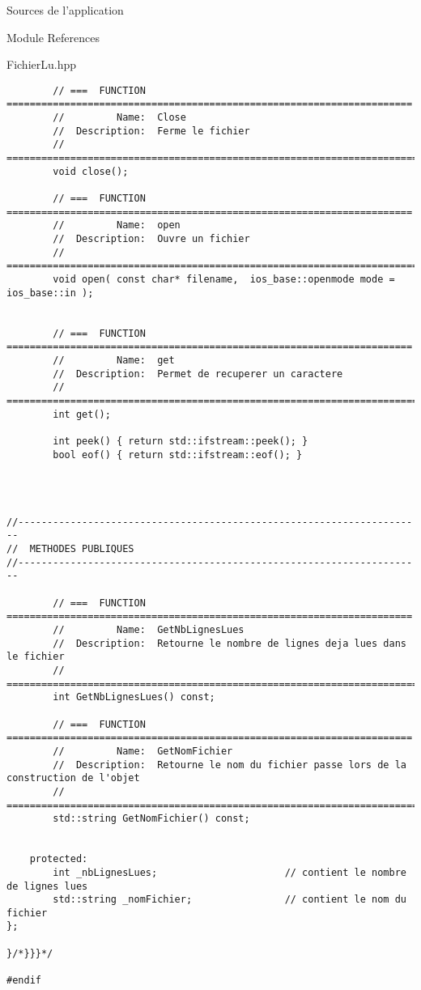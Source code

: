 \documentclass{article}
\begin{document}
\begin{section}{Sources de l'application}
\begin{subsection}{Module References}
\begin{paragraph}{FichierLu.hpp}
\begin{verbatim}
        // ===  FUNCTION  ======================================================================
        //         Name:  Close
        //  Description:  Ferme le fichier
        // =====================================================================================
        void close();

        // ===  FUNCTION  ======================================================================
        //         Name:  open
        //  Description:  Ouvre un fichier
        // =====================================================================================
        void open( const char* filename,  ios_base::openmode mode = ios_base::in );


        // ===  FUNCTION  ======================================================================
        //         Name:  get
        //  Description:  Permet de recuperer un caractere 
        // =====================================================================================
        int get();

        int peek() { return std::ifstream::peek(); }
        bool eof() { return std::ifstream::eof(); }




//----------------------------------------------------------------------
//  METHODES PUBLIQUES
//----------------------------------------------------------------------

        // ===  FUNCTION  ======================================================================
        //         Name:  GetNbLignesLues
        //  Description:  Retourne le nombre de lignes deja lues dans le fichier
        // =====================================================================================
        int GetNbLignesLues() const;

        // ===  FUNCTION  ======================================================================
        //         Name:  GetNomFichier
        //  Description:  Retourne le nom du fichier passe lors de la construction de l'objet 
        // =====================================================================================
        std::string GetNomFichier() const;


    protected:
        int _nbLignesLues;                      // contient le nombre de lignes lues
        std::string _nomFichier;                // contient le nom du fichier
};

}/*}}}*/

#endif
\end{verbatim}
  \end{paragraph}




\end{subsection}
\end{section}
\end{document}
